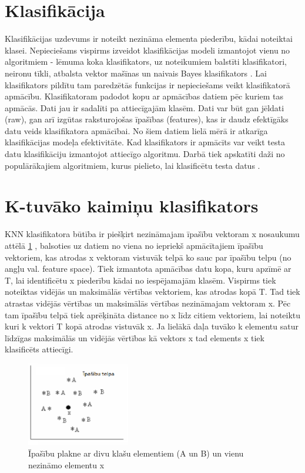 \documentclass[12pt,paper=A4]{report}
\begin{document}
\section{Klasifikācija}
Klasifikācijas uzdevums ir noteikt nezināma elementa piederību, kādai noteiktai klasei. Nepieciešams vispirms izveidot klasifikācijas modeli izmantojot vienu no algoritmiem -  lēmuma koka klasifikators, uz noteikumiem balstīti klasifikatori, neironu tīkli, atbalsta vektor mašīnas un naivais Bayes klasifikators \cite{http://www.sciencedirect.com/science/article/pii/S0957417410011759}. 
Lai klasifikators pildītu tam paredzētās funkcijas ir nepieciešams veikt klasifikatorā apmācību. Klasifikatoram padodot kopu ar apmācības datiem pēc kuriem tas apmācās. Dati jau ir sadalīti pa attiecīgajām klasēm. Dati var būt gan jēldati (raw), gan arī izgūtas raksturojošas īpašības (features), kas ir daudz efektīgāks datu veids klasifikatora apmācībai. No šiem datiem lielā mērā ir atkarīga klasifikācijas modeļa efektivitāte. 
Kad klasifikators ir apmācīts var veikt testa datu klasifikāciju izmantojot attiecīgo algoritmu. 
Darbā tiek apskatīti daži no populārākajiem algoritmiem, kurus pielieto, lai klasificētu testa datus \cite{knn}. 

\section{K-tuvāko kaimiņu klasifikators}


KNN klasifikatora būtība ir piešķirt nezināmajam īpašību vektoram x nosaukumu attēlā \ref{klass} , balsoties uz datiem no viena no iepriekš apmācītajiem īpašību vektoriem, kas atrodas x vektoram vistuvāk telpā ko sauc par īpašību telpu  (no angļu val. feature space). Tiek izmantota apmācības datu kopa, kuru apzīmē ar T, lai identificētu x piederību kādai no iespējamajām klasēm. Vispirms tiek noteiktas vidējās un maksimālās vērtības vektoriem, kas atrodas kopā T. Tad tiek atrastas vidējās vērtības un maksimālās vērtības nezināmajam vektoram x. Pēc tam īpašību telpā tiek aprēķināta distance no x līdz citiem vektoriem, lai noteiktu kuri k vektori T kopā atrodas vistuvāk x. Ja lielākā daļa tuvāko k elementu satur līdzīgas maksimālās un vidējās vērtības kā vektors x tad elements x tiek klasificēts attiecīgi. 


 \begin{figure}[H] \centering
\includegraphics[width=0.40\textwidth]{knn} 
\caption{Īpašību plakne ar divu klašu elementiem (A un B) un vienu nezināmo elementu x \cite{knn}}  \label{klass} 
\end{figure}
\end{document}
